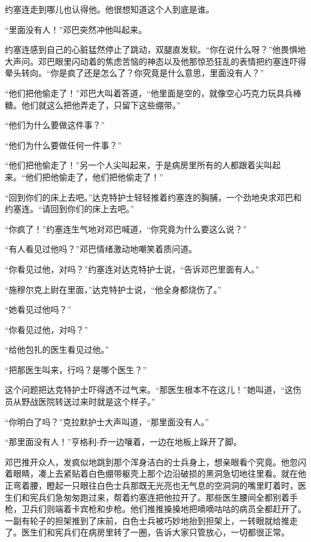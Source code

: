     约塞连走到哪儿也认得他。他很想知道这个人到底是谁。

    “里面没有人！”邓巴突然冲他叫起来。

    约塞连感到自己的心脏猛然停止了跳动，双腿直发软。“你在说什么呀？”他畏惧地大声问。邓巴眼里闪动着的焦虑苦恼的神态以及他那惊恐狂乱的表情把约塞连吓得晕头转向。“你是疯了还是怎么了？你究竟是什么意思，里面没有人？”

    “他们把他偷走了！”邓巴大叫着答道，“他里面是空的，就像空心巧克力玩具兵棒糖。他们就这么把他弄走了，只留下这些绷带。”

    “他们为什么要做这件事？”

    “他们为什么要做任何一件事？”

    “他们把他偷走了！”另一个人尖叫起来，于是病房里所有的人都跟着尖叫起来。“他们把他偷走了，他们把他偷走了！”

    “回到你们的床上去吧。”达克特护士轻轻推着约塞连的胸脯，一个劲地央求邓巴和约塞连。“请回到你们的床上去吧。”

    “你疯了！”约塞连生气地对邓巴喊道，“你究竟为什么要这么说？”

    “有人看见过他吗？”邓巴情绪激动地嘲笑着质问道。

    “你看见过他，对吗？”约塞连对达克特护士说，“告诉邓巴里面有人。”

    “施穆尔克上尉在里面，”达克特护士说，“他全身都烧伤了。”

    “她看见过他吗？”

    “你看见过他，对吗？”

    “给他包扎的医生看见过他。”

    “把那医生叫来，行吗？是哪个医生？”

    这个问题把达克特护士吓得透不过气来。“那医生根本不在这儿！”她叫道，“这伤员从野战医院转送过来时就是这个样子。”

    “你明白了吗？”克拉默护士大声叫道，“那里面没有人。”

    “那里面没有人！”亨格利-乔一边嚷着，一边在地板上跺开了脚。

    邓巴推开众人，发疯似地跳到那个浑身洁白的士兵身上，想亲眼看个究竟。他忽闪着眼睛，凑上去紧贴着白色绷带躯壳上那个边沿破损的黑洞急切地往里看。就在他正弯着腰，瞪起一只眼往白色士兵那既无光亮也无气息的空洞洞的嘴里盯着时，医生们和宪兵们急匆匆跑过来，帮着约塞连把他拉开了。那些医生腰间全都别着手枪，卫兵们则端着卡宾枪和步枪。他们推推搡搡地把嘀嘀咕咕的病员全都赶开了。一副有轮子的担架推到了床前，白色士兵被巧妙地抬到担架上，一转眼就给推走了。医生们和宪兵们在病房里转了一圈，告诉大家只管放心，一切都很正常。

